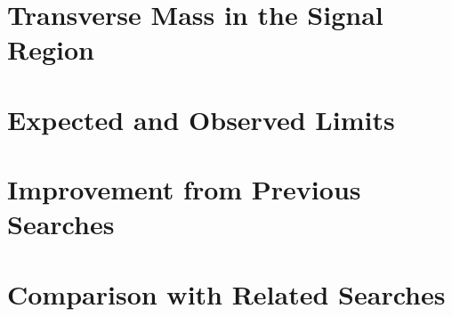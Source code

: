 \section{Transverse Mass in the Signal Region}
\section{Expected and Observed Limits}
\section{Improvement from Previous Searches}
\section{Comparison with Related Searches}
